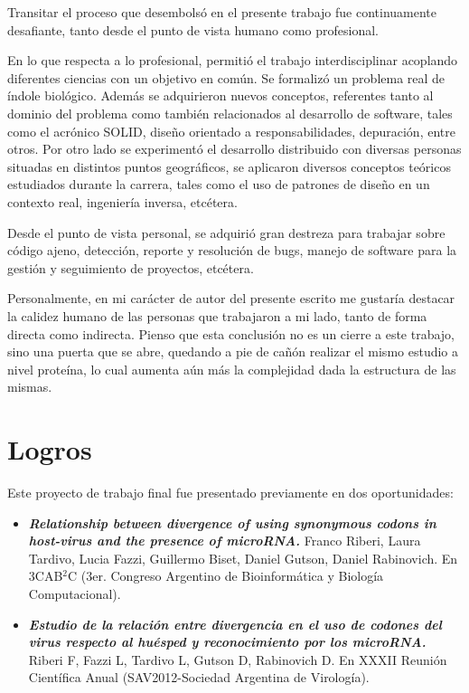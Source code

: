 \par Transitar el proceso que desembolsó en el presente trabajo fue continuamente desafiante, tanto desde el punto de vista humano como profesional.

\par En lo que respecta a lo profesional, permitió el trabajo interdisciplinar acoplando diferentes ciencias con un objetivo en común. Se formalizó un problema real de índole biológico. Además se adquirieron nuevos conceptos, referentes tanto al dominio del problema como también relacionados al desarrollo de software, tales como el acrónico SOLID, diseño orientado a responsabilidades, depuración, entre otros. Por otro lado se experimentó el desarrollo distribuido con diversas personas situadas en distintos puntos geográficos, se aplicaron diversos conceptos teóricos estudiados durante la carrera, tales como el uso de patrones de diseño en un contexto real, ingeniería inversa, etcétera. 

\par Desde el punto de vista personal, se adquirió gran destreza para trabajar sobre código ajeno, detección, reporte y resolución de bugs, manejo de software para la gestión y seguimiento de proyectos, etcétera. 

\par Personalmente, en mi carácter de autor del presente escrito me gustaría destacar la calidez humano de las personas que trabajaron a mi lado, tanto de forma directa como indirecta. Pienso que esta conclusión no es un cierre a este trabajo, sino una puerta que se abre, quedando a pie de cañón realizar el mismo estudio a nivel proteína, lo cual aumenta aún más la complejidad dada la estructura de las mismas.

\section{Logros}
Este proyecto de trabajo final fue presentado previamente en dos oportunidades:
\begin{itemize}
    \item \emph{\textbf{Relationship between divergence of using synonymous codons in host-virus and the presence of microRNA.}} Franco	Riberi, Laura Tardivo, Lucia Fazzi, Guillermo Biset, Daniel Gutson, Daniel Rabinovich. En 3CAB$^{2}$C (3er. Congreso Argentino de Bioinformática y Biología Computacional).

    \item \emph{\textbf{Estudio de la relación entre divergencia  en el uso de codones del virus respecto al huésped y reconocimiento por los microRNA.}} Riberi F, Fazzi L, Tardivo L, Gutson D, Rabinovich D. En XXXII Reunión Científica Anual (SAV2012-Sociedad Argentina de Virología).    
\end{itemize}

